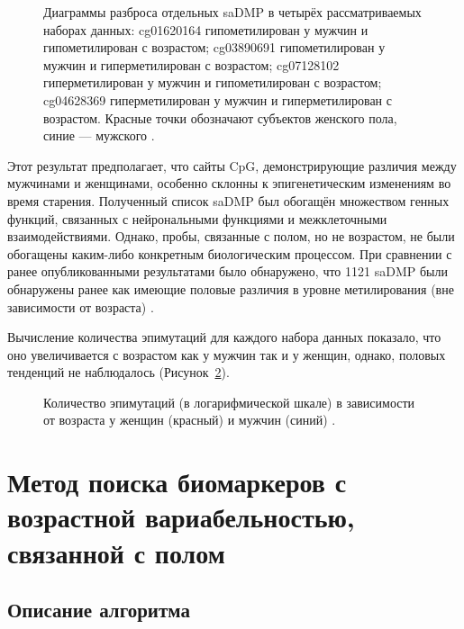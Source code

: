 \begin{figure}[ht]
	\caption{Диаграммы разброса отдельных saDMP в четырёх рассматриваемых наборах данных: cg01620164 гипометилирован у мужчин и гипометилирован с возрастом; cg03890691 гипометилирован у мужчин и гиперметилирован с возрастом; cg07128102 гиперметилирован у мужчин и гипометилирован с возрастом; cg04628369 гиперметилирован у мужчин и гиперметилирован с возрастом. Красные точки обозначают субъектов женского пола, синие --- мужского \autocite{Yusipov2020}.}\label{fig:saDMP}
\end{figure}

Этот результат предполагает, что сайты CpG, демонстрирующие различия между мужчинами и женщинами, особенно склонны к эпигенетическим изменениям во время старения. Полученный список saDMP был обогащён множеством генных функций, связанных с нейрональными функциями и межклеточными взаимодействиями. Однако, пробы, связанные с полом, но не возрастом, не были обогащены каким-либо конкретным биологическим процессом. При сравнении с ранее опубликованными результатами было обнаружено, что 1121 saDMP были обнаружены ранее как имеющие половые различия в уровне метилирования (вне зависимости от возраста) \autocite{Inoshita2015, Singmann2015, Yousefi2015}. 

Вычисление количества эпимутаций для каждого набора данных показало, что оно увеличивается с возрастом как у мужчин так и у женщин, однако, половых тенденций не наблюдалось (Рисунок~\ref{fig:epimutations}). 

\begin{figure}[ht]
	\caption{Количество эпимутаций (в логарифмической шкале) в зависимости от возраста у женщин (красный) и мужчин (синий) \autocite{Yusipov2020}.}\label{fig:epimutations}
\end{figure}

\section{Метод поиска биомаркеров с возрастной вариабельностью, связанной с полом}\label{sec:ch2/sec3}

\subsection{Описание алгоритма}\label{subsec:ch2/sec3/subsec1}




